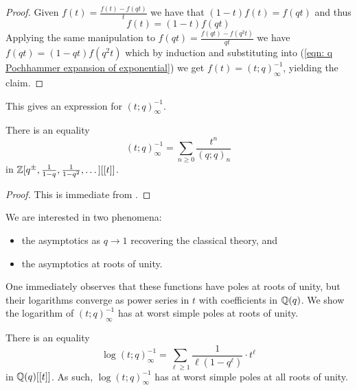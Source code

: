 \begin{proof}
    Given $f(t)=\frac{f(t)-f(qt)}{t}$ we have that $(1-t)f(t)=f(qt)$ and thus 
    \begin{equation}\label{eqn: q Pochhammer expansion of exponential}
        f(t) = (1-t)f(qt)
    \end{equation} Applying the same manipulation to $f(qt)=\frac{f(qt)-f(q^{2}t)}{qt}$ we have $f(qt)=(1-qt)f(q^{2}t)$ which by induction and substituting into (\ref{eqn: q Pochhammer expansion of exponential}) we get $f(t)=(t;q)_{\infty}^{-1}$, yielding the claim. 
\end{proof}
This gives an expression for $(t;q)_{\infty}^{-1}$. 
\begin{corollary}\label{corr: expansion of t q Pochhammer}
    There is an equality
    $$(t;q)_{\infty}^{-1}=\sum_{n\geq0}\frac{t^{n}}{(q;q)_{n}}$$
    in $\mathbb{Z}[q^{\pm},\frac{1}{1-q},\frac{1}{1-q^{2}}, \dots][[t]]$.
\end{corollary}
\begin{proof}
    This is immediate from .
\end{proof}
We are interested in two phenomena:
\begin{itemize}
    \item the asymptotics as $q\to 1$ recovering the classical theory, and 
    \item the asymptotics at roots of unity. 
\end{itemize}
One immediately observes that these functions have poles at roots of unity, but their logarithms converge as power series in $t$ with coefficients in $\mathbb{Q}(q)$. We show the logarithm of $(t;q)_{\infty}^{-1}$ has at worst simple poles at roots of unity. 
\begin{proposition}\label{prop: logarithm at worst simple poles at roots of unity}
    There is an equality 
    \begin{equation}\label{eqn: expresssion of logarithm of q exponential}
        \log(t;q)_{\infty}^{-1}=\sum_{\ell\geq1}\frac{1}{\ell(1-q^{\ell})}\cdot t^{\ell}
    \end{equation}
    in $\mathbb{Q}(q)[[t]]$. As such, $\log(t;q)_{\infty}^{-1}$ has at worst simple poles at all roots of unity. 
\end{proposition}
